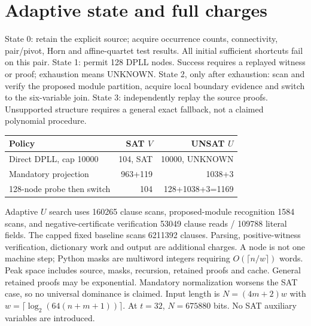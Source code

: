 \documentclass[11pt]{article}
\begin{document}
\section{Adaptive state and full charges}
State 0: retain the explicit source; acquire occurrence counts, connectivity, pair/pivot, Horn and affine-quartet test results. All initial sufficient shortcuts fail on this pair. State 1: permit 128 DPLL nodes. Success requires a replayed witness or proof; exhaustion means UNKNOWN. State 2, only after exhaustion: scan and verify the proposed module partition, acquire local boundary evidence and switch to the six-variable join. State 3: independently replay the source proofs. Unsupported structure requires a general exact fallback, not a claimed polynomial procedure.
\begin{center}\begin{tabular}{lrr}\toprule
Policy&SAT $V$&UNSAT $U$\\\midrule
Direct DPLL, cap 10000&104, SAT&10000, UNKNOWN\\
Mandatory projection&963+119&1038+3\\
128-node probe then switch&104&128+1038+3=1169\\\bottomrule
\end{tabular}\end{center}
Adaptive $U$ search uses 160265 clause scans, proposed-module recognition 1584 scans, and negative-certificate verification 53049 clause reads / 109788 literal fields. The capped fixed baseline scans 6211392 clauses. Parsing, positive-witness verification, dictionary work and output are additional charges. A node is not one machine step; Python masks are multiword integers requiring $O(\lceil n/w\rceil)$ words. Peak space includes source, masks, recursion, retained proofs and cache. General retained proofs may be exponential. Mandatory normalization worsens the SAT case, so no universal dominance is claimed.
Input length is $N=(4m+2)w$ with $w=\lceil\log_2(64(n+m+1))\rceil$. At $t=32$, $N=675880$ bits. No SAT auxiliary variables are introduced.
\end{document}
